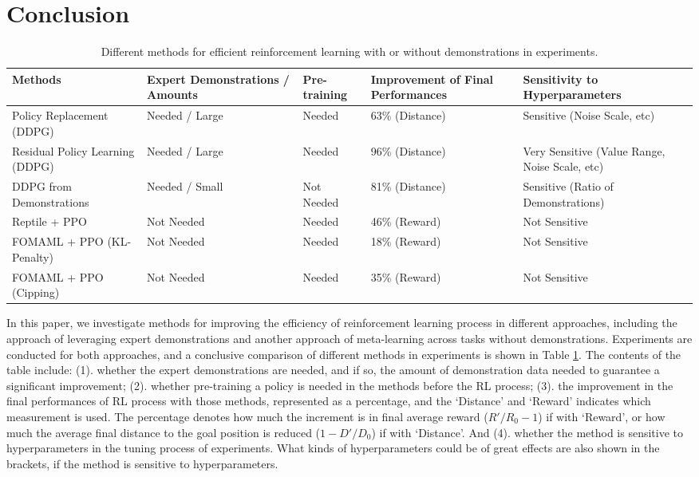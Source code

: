 \documentclass{article}
\begin{document}
\newpage
\section{Conclusion}
\begin{table}
    \centering
\begin{tabular}{ |p{2.5cm}<{\centering}|p{3cm}<{\centering}|p{2cm}<{\centering}|p{3cm}<{\centering}|p{3cm}<{\centering}|}
\hline
Methods & Expert Demonstrations / Amounts & Pre-training & Improvement of Final Performances & Sensitivity to Hyperparameters\\
\hline
\hline
{Policy Replacement (DDPG)} & Needed / Large & Needed & 63\% (Distance) & Sensitive (Noise Scale, etc)\\
\hline 
{Residual Policy Learning (DDPG)} & Needed / Large  & Needed & 96\% (Distance) & Very Sensitive (Value Range, Noise Scale, etc)\\
\hline 
{DDPG from Demonstrations} & Needed / Small & Not Needed & 81\% (Distance) & Sensitive (Ratio of Demonstrations)\\
\hline
\hline 
Reptile + PPO & Not Needed & Needed & 46\% (Reward) & Not Sensitive\\
\hline 
FOMAML + PPO (KL-Penalty) & Not Needed & Needed & 18\% (Reward) & Not Sensitive\\
\hline
FOMAML + PPO (Cipping) & Not Needed & Needed & 35\% (Reward) & Not Sensitive\\
\hline 
\end{tabular}
\caption{Different methods for efficient reinforcement learning with or without demonstrations in experiments.}
\label{table:2}
\end{table}

In this paper, we investigate methods for improving the efficiency of reinforcement learning process in different approaches, including the approach of leveraging expert demonstrations and another approach of meta-learning across tasks without demonstrations. Experiments are conducted for both approaches, and a conclusive comparison of different methods in experiments is shown in Table \ref{table:2}. The contents of the table include: (1). whether the expert demonstrations are needed, and if so, the amount of demonstration data needed to guarantee a significant improvement; (2). whether pre-training a policy is needed in the methods before the RL process; (3). the improvement in the final performances of RL process with those methods, represented as a percentage, and the `Distance' and `Reward' indicates which measurement is used. The percentage denotes how much the increment is in final average reward ($R'/R_0-1$) if with `Reward', or how much the average final distance to the goal position is reduced ($1-D'/D_0$) if with `Distance'. And (4). whether the method is sensitive to hyperparameters in the tuning process of experiments. What kinds of hyperparameters could be of great effects are also shown in the brackets, if the method is sensitive to hyperparameters.
\end{document}
